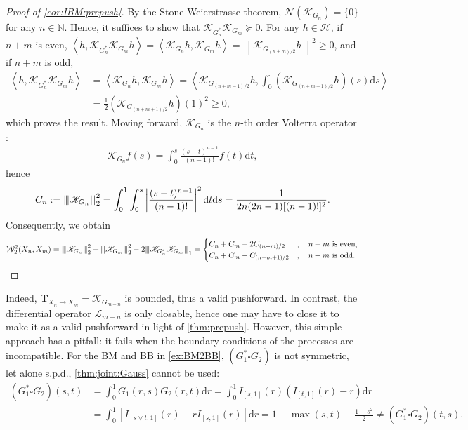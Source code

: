 \documentclass[noinfoline]{imsart}\setcounter{tocdepth}{2}
\renewcommand{\b}[1]{\mathbb{#1}} %
\newcommand{\m}[1]{\mathbf{#1}} %
\newcommand{\s}[1]{\mathscr{#1}} %
\renewcommand{\c}[1]{\mathcal{#1}} %
\newcommand{\innpr}[2]{{\left\langle {#1},{#2}\right\rangle}} %
\newcommand{\rd}{\mathrm{d}} %
\newcommand{\vertii}[1]{{\vert\kern-0.25ex\vert\kern-0.25ex\vert #1 
    \vert\kern-0.25ex\vert\kern-0.25ex\vert}} %
\theoremstyle{plain}
\begin{document}
\begin{proof}[Proof of \cref{cor:IBM:prepush}]
By the Stone-Weierstrasse theorem, $\c{N}(\s{K}_{G_{n}}) = \{0\}$ for any $n \in \b{N}$. Hence, it suffices to show that $\s{K}_{G_{n}^{*}} \s{K}_{G_{m}} \succeq 0$. For any $h \in \c{H}$, if $n+m$ is even, $\innpr{h}{\s{K}_{G_{n}^{*}} \s{K}_{G_{m}} h} = \innpr{\s{K}_{G_{n}} h}{\s{K}_{G_{m}} h} = \left\| \s{K}_{G_{(n+m)/2}} h \right\|^{2} \ge 0$, and if $n+m$ is odd,
\begin{align*}
    \innpr{h}{\s{K}_{G_{n}^{*}} \s{K}_{G_{m}} h} 
    &= \innpr{\s{K}_{G_{n}} h}{\s{K}_{G_{m}} h} = \innpr{\s{K}_{G_{(n+m-1)/2}} h}{\int_{0}^{\cdot} (\s{K}_{G_{(n+m-1)/2}} h)(s) \rd s} \\
    &= \frac{1}{2} (\s{K}_{G_{(n+m+1)/2}} h)(1)^{2} \ge 0,
\end{align*}
which proves the result. Moving forward, $\s{K}_{G_{n}}$ is the $n$-th order Volterra operator \cite{gohberg1978introduction, paulsen2016introduction}:
\begin{align*}
    \s{K}_{G_{n}} f (s) = \int_{0}^{s} \frac{(s-t)^{n-1}}{(n-1)!} f(t) \rd t,
\end{align*}
hence
\begin{align*}
    C_{n} := \vertii{\s{K}_{G_{n}}}_{2}^{2} = \int_{0}^{1} \int_{0}^{s} \left| \frac{(s-t)^{n-1}}{(n-1)!} \right|^{2} \rd t \rd s = \frac{1}{2n(2n-1)[(n-1)!]^{2}}.
\end{align*}
Consequently, we obtain
\begin{align*}
    \c{W}_{2}^{2}(X_{n}, X_{m}) = \vertii{\s{K}_{G_{n}}}_{2}^{2} + \vertii{\s{K}_{G_{m}}}_{2}^{2} - 2 \vertii{\s{K}_{G_{n}^{*}} \s{K}_{G_{m}}}_{1} = 
    \begin{cases}
        C_{n} + C_{m} - 2 C_{(n+m)/2} &, \quad n+m \text{ is even}, \\
        C_{n} + C_{m} - C_{(n+m+1)/2} &, \quad n+m \text{ is odd}.
    \end{cases} 
\end{align*}
\end{proof}

Indeed, $\m{T}_{X_{n} \to X_{m}} = \s{K}_{G_{m-n}}$ is bounded, thus a valid pushforward. In contrast, the differential operator $\s{L}_{m-n}$ is only closable, hence one may have to close it to make it as a valid pushforward in light of \cref{thm:prepush}.
However, this simple approach has a pitfall: it fails when the boundary conditions of the processes are incompatible. For the BM and BB in \cref{ex:BM2BB}, $(G_{1}^{*} \square G_{2})$ is not symmetric, let alone s.p.d., \cref{thm:joint:Gauss} cannot be used:
\begin{align*}
    (G_{1}^{*} \square G_{2}) (s, t) &= \int_{0}^{1} G_{1}(r, s) G_{2} (r, t) \rd r = \int_{0}^{1} I_{[s, 1]}(r) (I_{[t, 1]}(r) - r) \rd r \\
    &= \int_{0}^{1} [I_{[s \vee t, 1]}(r) - r I_{[s, 1]}(r)] \rd r
    = 1- \max(s, t) - \frac{1-s^{2}}{2} \neq (G_{1}^{*} \square G_{2}) (t, s).
\end{align*}
\end{document}
